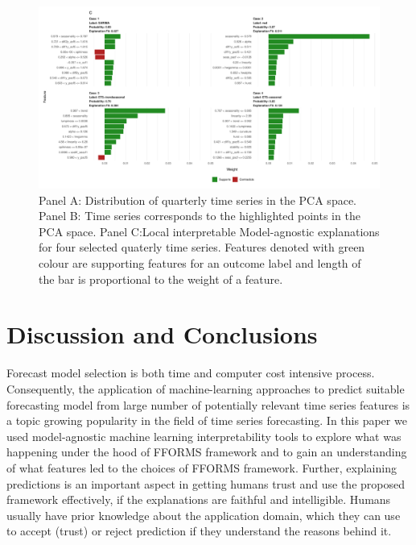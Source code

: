 \documentclass[11pt,a4paper,]{article}
\begin{document}
\begin{figure}[h]

{\centering \includegraphics{figures/quarterlylime2-1} 

}

\caption{Panel A: Distribution of quarterly time series in the PCA space. Panel B: Time series corresponds to the highlighted points in the PCA space. Panel C:Local interpretable Model-agnostic explanations for four selected quaterly time series. Features denoted with green colour are supporting features for an outcome label and length of the bar is proportional to the weight of a feature.}\label{fig:quarterlylime2}
\end{figure}

\section{Discussion and Conclusions}\label{conclusions}

Forecast model selection is both time and computer cost intensive
process. Consequently, the application of machine-learning approaches to
predict suitable forecasting model from large number of potentially
relevant time series features is a topic growing popularity in the field
of time series forecasting. In this paper we used model-agnostic machine
learning interpretability tools to explore what was happening under the
hood of FFORMS framework and to gain an understanding of what features
led to the choices of FFORMS framework. Further, explaining predictions
is an important aspect in getting humans trust and use the proposed
framework effectively, if the explanations are faithful and
intelligible. Humans usually have prior knowledge about the application
domain, which they can use to accept (trust) or reject prediction if
they understand the reasons behind it.
\end{document}
